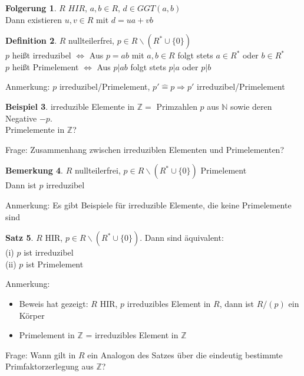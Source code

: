 \documentclass[10pt,a4paper,numbers=endperiod]{scrartcl}
\theoremstyle{definition}
\newtheorem{satz}{Satz}[section]
\newtheorem{defi}[satz]{Definition}
\newtheorem{bem}[satz]{Bemerkung}
\newtheorem{bsp}[satz]{Beispiel}
\newtheorem{folg}[satz]{Folgerung}
\def\NN{{\mathbb N}}
\def\ZZ{{\mathbb Z}}
\begin{document}
\begin{folg}
	$R$ $HIR$, $a,b \in R$, $d \in GGT(a,b)$\\
	Dann existieren $u,v \in R$ mit $d = ua + vb$
\end{folg}

\begin{defi}
	$R$ nullteilerfrei, $p \in R \backslash (R^* \cup \{0\})$\\
	$p$ heißt irreduzibel $\Leftrightarrow$ Aus $p = ab$ mit $a,b \in R$ folgt stets $a \in R^*$ oder $b \in R^*$\\
	$p$ heißt Primelement $\Leftrightarrow$ Aus $p|ab$ folgt stets $p|a$ oder $p|b$
\end{defi}

Anmerkung: $p$ irreduzibel/Primelement, $p' \hat{=} p \Rightarrow p'$ irreduzibel/Primelement

\begin{bsp}
	irreduzible Elemente in $\ZZ =$ Primzahlen $p$ aus $\NN$ sowie deren Negative $-p$.\\
	Primelemente in $\ZZ$?
\end{bsp}

Frage: Zusammenhang zwischen irreduziblen Elementen und Primelementen?

\begin{bem}
	$R$ nullteilerfrei, $p \in R \backslash (R^* \cup \{0\})$ Primelement\\
	Dann ist $p$ irreduzibel
\end{bem}

Anmerkung: Es gibt Beispiele für irreduzible Elemente, die keine Primelemente sind

\begin{satz}
	$R$ HIR, $p \in R \backslash (R^* \cup \{0\})$. Dann sind äquivalent:\\
	(i) $p$ ist irreduzibel\\
	(ii) $p$ ist Primelement
\end{satz}

Anmerkung: \begin{itemize}
	\item Beweis hat gezeigt: $R$ HIR, $p$ irreduzibles Element in $R$, dann ist $R/ (p)$ ein Körper
	\item Primelement in $\ZZ$ = irreduzibles Element in $\ZZ$ 
\end{itemize}

Frage: Wann gilt in $R$ ein Analogon des Satzes über die eindeutig bestimmte Primfaktorzerlegung aus $\ZZ$? 
\end{document}
